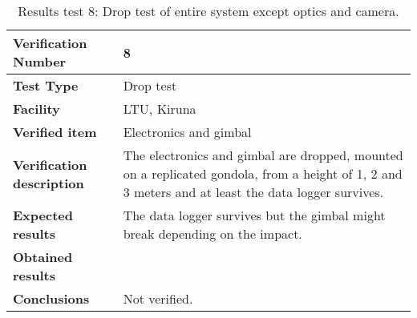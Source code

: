 \begin{table}[H]
\centering

\begin{tabular}{|m{}| m{} |}
\hline
\textbf{Verification Number} 		& 8 				\\ \hline
\textbf{Test Type} 					& Drop test			\\ \hline
\textbf{Facility} 					& LTU, Kiruna 		\\ \hline
\textbf{Verified item} 				& Electronics and gimbal \\ \hline

\textbf{Verification description} 	& The electronics and gimbal are dropped, mounted on a replicated gondola, from a height of 1, 2 and 3 meters and at least the data logger survives. \\ \hline

\textbf{Expected results} 			& The data logger survives but the gimbal might break depending on the impact. \\ \hline

\textbf{Obtained results} 			& \\ \hline

\textbf{Conclusions} 				& Not verified.		\\ \hline
\end{tabular}
\caption{Results test 8: Drop test of entire system except optics and camera.}
\label{tab:testresult8:droptest}
\end{table}


\raggedbottom
